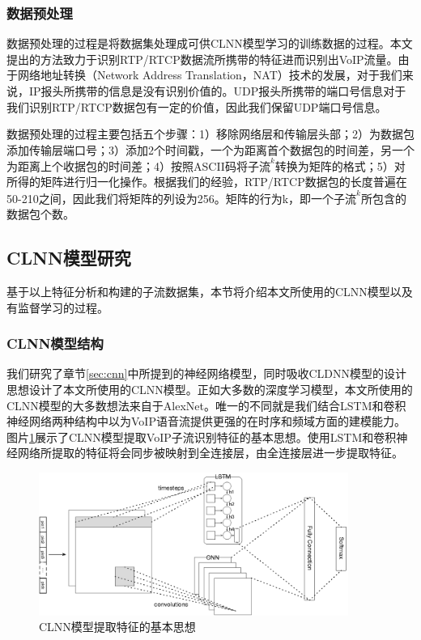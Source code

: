 \subsubsection{数据预处理}
数据预处理的过程是将数据集处理成可供CLNN模型学习的训练数据的过程。本文提出的方法致力于识别RTP/RTCP数据流所携带的特征进而识别出VoIP流量。由于网络地址转换（Network Address Translation，NAT）技术的发展，对于我们来说，IP报头所携带的信息是没有识别价值的。UDP报头所携带的端口号信息对于我们识别RTP/RTCP数据包有一定的价值，因此我们保留UDP端口号信息。

数据预处理的过程主要包括五个步骤：1）移除网络层和传输层头部；2）为数据包添加传输层端口号；3）添加2个时间戳，一个为距离首个数据包的时间差，另一个为距离上个收据包的时间差；4）按照ASCII码将$\text{子流}^k$转换为矩阵的格式；5）对所得的矩阵进行归一化操作。根据我们的经验，RTP/RTCP数据包的长度普遍在50-210之间，因此我们将矩阵的列设为256。矩阵的行为k，即一个$\text{子流}^k$所包含的数据包个数。

\subsection{CLNN模型研究}
基于以上特征分析和构建的子流数据集，本节将介绍本文所使用的CLNN模型以及有监督学习的过程。
\subsubsection{CLNN模型结构}

我们研究了章节\ref{sec:cnn}中所提到的神经网络模型，同时吸收CLDNN模型\supercite{clnn}的设计思想设计了本文所使用的CLNN模型。正如大多数的深度学习模型，本文所使用的CLNN模型的大多数想法来自于AlexNet。唯一的不同就是我们结合LSTM和卷积神经网络两种结构中以为VoIP语音流提供更强的在时序和频域方面的建模能力。图片\ref{fig:cnnlstm}展示了CLNN模型提取VoIP子流识别特征的基本思想。使用LSTM和卷积神经网络所提取的特征将会同步被映射到全连接层，由全连接层进一步提取特征。
\begin{figure}[thb]
\begin{center}
\includegraphics[width=0.9\textwidth]{figures/cnnlstm.eps}
\caption{CLNN模型提取特征的基本思想}\label{fig:cnnlstm}
\end{center}
\end{figure}

